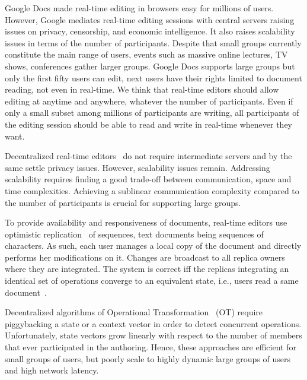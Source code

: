 
Google Docs made real-time editing in browsers easy for millions of
users. However, Google mediates real-time editing sessions with central servers
raising issues on privacy, censorship, and economic intelligence. It also raises
scalability issues in terms of the number of participants.  Despite that small
groups currently constitute the main range of users, events such as massive
online lectures, TV shows, conferences gather larger groups.  Google Docs
supports large groups but only the first fifty users can edit, next users have
their rights limited to document reading, not even in real-time.  We think that
real-time editors should allow editing at anytime and anywhere, whatever the
number of participants. Even if only a small subset among millions of
participants are writing, all participants of the editing session should be able
to read and write in real-time whenever they want.


Decentralized real-time editors~\cite{oster2006data, sun1998operational,
  sun2009contextbased} do not require intermediate servers and by the same
settle privacy issues. However, scalability issues remain.  Addressing
scalability requires finding a good trade-off between communication, space and
time complexities. Achieving a sublinear communication complexity compared to
the number of participants is crucial for supporting large groups.


To provide availability and responsiveness of documents, real-time editors use
optimistic replication~\cite{saito2005optimistic} of sequences, text documents
being sequences of characters. As such, each user manages a local copy of the
document and directly performs her modifications on it. Changes are broadcast to
all replica owners where they are integrated. The system is correct iff the
replicas integrating an identical set of operations converge to an equivalent
state, i.e., users read a same document~\cite{shapiro2011conflict}.

Decentralized algorithms of Operational
Transformation~\cite{sun2009contextbased} (OT) require piggybacking a state or a
context vector in order to detect concurrent operations. Unfortunately, state
vectors grow linearly with respect to the number of members that ever
participated in the authoring. Hence, these approaches are efficient for small
groups of users, but poorly scale to highly dynamic large groups of users and
high network latency.

